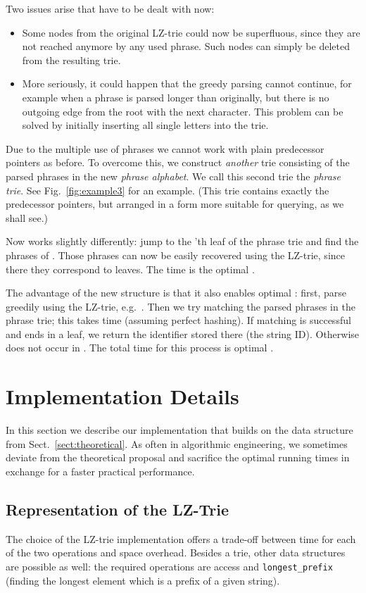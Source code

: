\documentclass{llncs}
\begin{document}
Two issues arise that have to be dealt with now:
\begin{itemize}
\item Some nodes from the original LZ-trie could now be superfluous, since they are not reached anymore by any used phrase. Such nodes can simply be deleted from the resulting trie.
\item More seriously, it could happen that the greedy parsing cannot continue, for example when a phrase is parsed longer than originally, but there is no outgoing edge from the root with the next character. This problem can be solved by initially inserting all single letters  into the trie.
\end{itemize}

Due to the multiple use of phrases we cannot work with plain predecessor pointers as before. To overcome this, we construct \emph{another} trie consisting of the parsed phrases in the new \emph{phrase alphabet}. We call this second trie the \emph{phrase trie}. See Fig.~\ref{fig:example3} for an example. (This trie contains exactly the predecessor pointers, but arranged in a form more suitable for querying, as we shall see.)

Now  works slightly differently: jump to the 'th leaf of the phrase trie and find the phrases of . Those phrases can now be easily recovered using the LZ-trie, since there they correspond to leaves. The time is the optimal .

The advantage of the new structure is that it also enables optimal : first, parse  greedily using the LZ-trie, e.g.~. Then we try matching the parsed phrases in the phrase trie; this takes  time (assuming perfect hashing). If matching is successful and ends in a leaf, we return the identifier stored there (the string ID). Otherwise  does not occur in . The total time for this process is optimal .

\section{Implementation Details}
\label{sect:implementation}

In this section we describe our implementation that builds on the data structure from Sect.~\ref{sect:theoretical}. As often in algorithmic engineering, we sometimes deviate from the theoretical proposal and sacrifice the optimal running times in exchange for a faster practical performance.

\subsection{Representation of the LZ-Trie}
The choice of the LZ-trie implementation offers a trade-off between time for each of the two operations and space overhead. Besides a trie, other data structures are possible as well: the required operations are access and \verb|longest_prefix| (finding the longest element which is a prefix of a given string).
\end{document}
